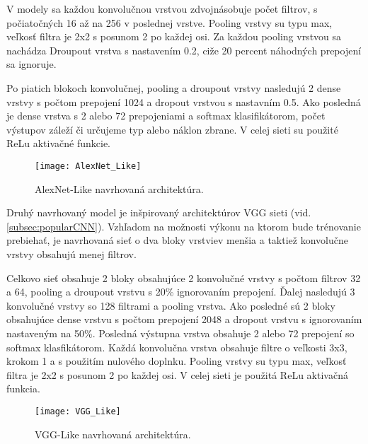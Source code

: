 V modely sa každou konvolučnou vrstvou zdvojnásobuje počet filtrov, s počiatočných 16 až na 256 v poslednej vrstve.
Pooling vrstvy su typu max, veľkosť filtra je 2x2 s posunom 2 po každej osi.
Za každou pooling vrstvou sa nachádza Droupout vrstva s nastavením 0.2, ciže 20 percent náhodných prepojení sa ignoruje.

Po piatich blokoch konvolučnej, pooling a droupout vrstvy nasledujú 2 dense vrstvy s počtom prepojení 1024 a dropout vrstvou s nastavním 0.5.
Ako posledná je dense vrstva s 2 alebo 72 prepojeniami a softmax klasifikátorom, počet výstupov záleží či určujeme typ alebo náklon zbrane.
V celej sieti su použité ReLu aktivačné funkcie.

\begin{figure}[H]
    \centering
    \texttt{[image: AlexNet\_Like]}
    \caption{AlexNet-Like navrhovaná architektúra.}
    \label{pic:kNN}
\end{figure}


Druhý navrhovaný model je inšpirovaný architektúrov VGG sieti (vid. \ref{subsec:popularCNN}).
Vzhľadom na možnosti výkonu na ktorom bude trénovanie prebiehať, je navrhovaná sieť o dva bloky vrstviev menšia a taktiež konvolučne vrstvy obsahujú menej filtrov.

Celkovo sieť obsahuje 2 bloky obsahujúce 2 konvolučné vrstvy s počtom filtrov 32 a 64, pooling a droupout vrstvu s 20\% ignorovaním prepojení.
Ďalej nasledujú 3 konvolučné vrstvy so 128 filtrami a pooling vrstva.
Ako posledné sú 2 bloky obsahujúce dense vrstvu s počtom prepojení 2048 a dropout vrstvu s ignorovaním nastaveným na 50\%.
Posledná výstupna vrstva obsahuje 2 alebo 72 prepojení so softmax klasfikátorom.
Každá konvolučna vrstva obsahuje filtre o veľkosti 3x3, krokom 1 a s použitím nulového doplnku.
Pooling vrstvy su typu max, veľkosť filtra je 2x2 s posunom 2 po každej osi.
V celej sieti je použitá ReLu aktivačná funkcia.

\begin{figure}[H]
    \centering
    \texttt{[image: VGG\_Like]}
    \caption{VGG-Like navrhovaná architektúra.}
    \label{pic:kNN}
\end{figure}
